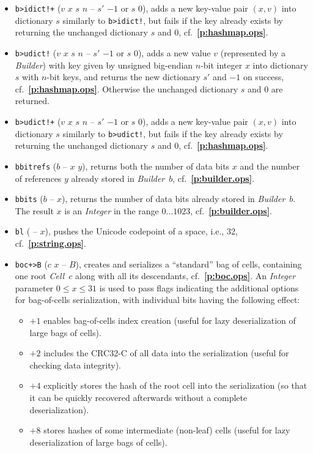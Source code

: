 \documentclass[12pt,oneside]{article}
\def\refpoint#1{{\rm\textbf{\ref{#1}}}}
\let\ptref=\refpoint
\begin{document}
\begin{itemize}
\item {\tt b>idict!+} ($v$ $x$ $s$ $n$ -- $s'$ $-1$ or $s$ $0$), adds a new key-value pair $(x,v)$ into dictionary $s$ similarly to {\tt b>idict!}, but fails if the key already exists by returning the unchanged dictionary $s$ and $0$, cf.~\ptref{p:hashmap.ops}.
\item {\tt b>udict!} ($v$ $x$ $s$ $n$ -- $s'$ $-1$ or $s$ $0$), adds a new value $v$ (represented by a {\em Builder}) with key given by unsigned big-endian $n$-bit integer $x$ into dictionary $s$ with $n$-bit keys, and returns the new dictionary $s'$ and $-1$ on success, cf.~\ptref{p:hashmap.ops}. Otherwise the unchanged dictionary $s$ and $0$ are returned.
\item {\tt b>udict!+} ($v$ $x$ $s$ $n$ -- $s'$ $-1$ or $s$ $0$), adds a new key-value pair $(x,v)$ into dictionary $s$ similarly to {\tt b>udict!}, but fails if the key already exists by returning the unchanged dictionary $s$ and $0$, cf.~\ptref{p:hashmap.ops}.
\item {\tt bbitrefs} ($b$ -- $x$ $y$), returns both the number of data bits $x$ and the number of references $y$ already stored in {\em Builder\/}~$b$, cf.~\ptref{p:builder.ops}.
\item {\tt bbits} ($b$ -- $x$), returns the number of data bits already stored in {\em Builder\/}~$b$. The result $x$ is an {\em Integer\/} in the range $0\dots1023$, cf.~\ptref{p:builder.ops}.
\item {\tt bl} ( -- $x$), pushes the Unicode codepoint of a space, i.e., 32, cf.~\ptref{p:string.ops}.
\item {\tt boc+>B} ($c$ $x$ -- $B$), creates and serializes a ``standard'' bag of cells, containing one root {\em Cell\/}~$c$ along with all its descendants, cf.~\ptref{p:boc.ops}. An {\em Integer\/} parameter $0\leq x\leq 31$ is used to pass flags indicating the additional options for bag-of-cells serialization, with individual bits having the following effect:
  \begin{itemize}
  \item $+1$ enables bag-of-cells index creation (useful for lazy deserialization of large bags of cells).
  \item $+2$ includes the CRC32-C of all data into the serialization (useful for checking data integrity).
  \item $+4$ explicitly stores the hash of the root cell into the serialization (so that it can be quickly recovered afterwards without a complete deserialization).
  \item $+8$ stores hashes of some intermediate (non-leaf) cells (useful for lazy deserialization of large bags of cells).

\end{itemize}
\end{itemize}
\end{document}
